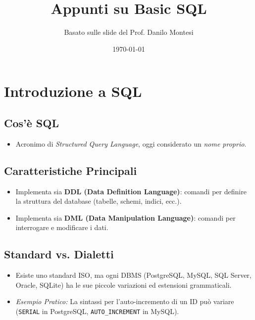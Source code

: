\documentclass{article}
\title{Appunti su Basic SQL}
\author{Basato sulle slide del Prof. Danilo Montesi}
\date{\today}
\begin{document}
	
	\maketitle
	\tableofcontents
	\newpage
	
	\section{Introduzione a SQL}
	
	\subsection{Cos'è SQL}
	\begin{itemize}
		\item Acronimo di \textit{Structured Query Language}, oggi considerato un \textit{nome proprio}.
	\end{itemize}
	
	\subsection{Caratteristiche Principali}
	\begin{itemize}
		\item Implementa sia \textbf{DDL (Data Definition Language)}: comandi per definire la struttura del database (tabelle, schemi, indici, ecc.).
		\item Implementa sia \textbf{DML (Data Manipulation Language)}: comandi per interrogare e modificare i dati.
	\end{itemize}
	
	\subsection{Standard vs. Dialetti}
	\begin{itemize}
		\item Esiste uno standard ISO, ma ogni DBMS (PostgreSQL, MySQL, SQL Server, Oracle, SQLite) ha le sue piccole variazioni ed estensioni grammaticali.
		\item \textit{Esempio Pratico:} La sintassi per l'auto-incremento di un ID può variare (\texttt{SERIAL} in PostgreSQL, \texttt{AUTO\_INCREMENT} in MySQL).
	\end{itemize}
	
\end{document}
